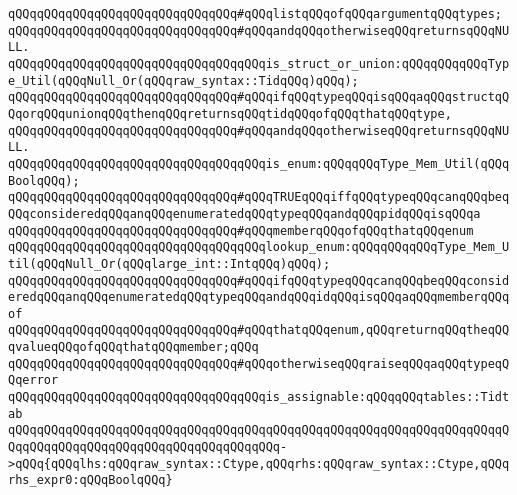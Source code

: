 \verb|qQQqqQQqqQQqqQQqqQQqqQQqqQQqqQQq#qQQqlistqQQqofqQQqargumentqQQqtypes;|\newline
\verb|qQQqqQQqqQQqqQQqqQQqqQQqqQQqqQQq#qQQqandqQQqotherwiseqQQqreturnsqQQqNULL.|\newline
\newline
\newline
\verb|qQQqqQQqqQQqqQQqqQQqqQQqqQQqqQQqqQQqis_struct_or_union:qQQqqQQqqQQqType_Util(qQQqNull_Or(qQQqraw_syntax::TidqQQq)qQQq);|\newline
\verb|qQQqqQQqqQQqqQQqqQQqqQQqqQQqqQQq#qQQqifqQQqtypeqQQqisqQQqaqQQqstructqQQqorqQQqunionqQQqthenqQQqreturnsqQQqtidqQQqofqQQqthatqQQqtype,|\newline
\verb|qQQqqQQqqQQqqQQqqQQqqQQqqQQqqQQq#qQQqandqQQqotherwiseqQQqreturnsqQQqNULL.|\newline
\newline
\newline
\verb|qQQqqQQqqQQqqQQqqQQqqQQqqQQqqQQqqQQqis_enum:qQQqqQQqType_Mem_Util(qQQqBoolqQQq);|\newline
\verb|qQQqqQQqqQQqqQQqqQQqqQQqqQQqqQQq#qQQqTRUEqQQqiffqQQqtypeqQQqcanqQQqbeqQQqconsideredqQQqanqQQqenumeratedqQQqtypeqQQqandqQQqpidqQQqisqQQqa|\newline
\verb|qQQqqQQqqQQqqQQqqQQqqQQqqQQqqQQq#qQQqmemberqQQqofqQQqthatqQQqenum|\newline
\newline
\newline
\verb|qQQqqQQqqQQqqQQqqQQqqQQqqQQqqQQqqQQqlookup_enum:qQQqqQQqqQQqType_Mem_Util(qQQqNull_Or(qQQqlarge_int::IntqQQq)qQQq);|\newline
\verb|qQQqqQQqqQQqqQQqqQQqqQQqqQQqqQQq#qQQqifqQQqtypeqQQqcanqQQqbeqQQqconsideredqQQqanqQQqenumeratedqQQqtypeqQQqandqQQqidqQQqisqQQqaqQQqmemberqQQqof|\newline
\verb|qQQqqQQqqQQqqQQqqQQqqQQqqQQqqQQq#qQQqthatqQQqenum,qQQqreturnqQQqtheqQQqvalueqQQqofqQQqthatqQQqmember;qQQq|\newline
\verb|qQQqqQQqqQQqqQQqqQQqqQQqqQQqqQQq#qQQqotherwiseqQQqraiseqQQqaqQQqtypeqQQqerror|\newline
\newline
\newline
\verb|qQQqqQQqqQQqqQQqqQQqqQQqqQQqqQQqqQQqis_assignable:qQQqqQQqtables::Tidtab|\newline
\verb|qQQqqQQqqQQqqQQqqQQqqQQqqQQqqQQqqQQqqQQqqQQqqQQqqQQqqQQqqQQqqQQqqQQqqQQqqQQqqQQqqQQqqQQqqQQqqQQqqQQqqQQqqQQq->qQQq{qQQqlhs:qQQqraw_syntax::Ctype,qQQqrhs:qQQqraw_syntax::Ctype,qQQqrhs_expr0:qQQqBoolqQQq}|\newline
